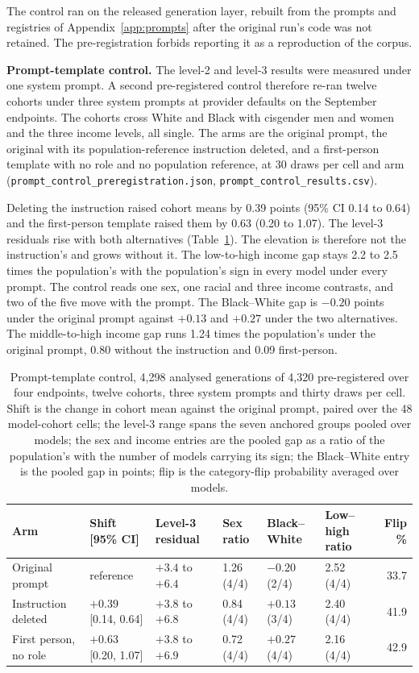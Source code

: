 \documentclass[wcp]{jmlr}
\begin{document}
The control ran on the released generation layer, rebuilt from the prompts and registries of Appendix~\ref{app:prompts} after the original run's code was not retained. The pre-registration forbids reporting it as a reproduction of the corpus.

\textbf{Prompt-template control.} The level-2 and level-3 results were measured under one system prompt. A second pre-registered control therefore re-ran twelve cohorts under three system prompts at provider defaults on the September endpoints. The cohorts cross White and Black with cisgender men and women and the three income levels, all single. The arms are the original prompt, the original with its population-reference instruction deleted, and a first-person template with no role and no population reference, at 30 draws per cell and arm (\texttt{prompt\_control\_preregistration.json}, \texttt{prompt\_control\_results.csv}).

Deleting the instruction raised cohort means by 0.39 points (95\% CI 0.14 to 0.64) and the first-person template raised them by 0.63 (0.20 to 1.07). The level-3 residuals rise with both alternatives (Table~\ref{tab:promptctl}). The elevation is therefore not the instruction's and grows without it. The low-to-high income gap stays 2.2 to 2.5 times the population's with the population's sign in every model under every prompt. The control reads one sex, one racial and three income contrasts, and two of the five move with the prompt. The Black--White gap is $-0.20$ points under the original prompt against $+0.13$ and $+0.27$ under the two alternatives. The middle-to-high income gap runs 1.24 times the population's under the original prompt, 0.80 without the instruction and 0.09 first-person.

\begin{table}[!htb]
\centering
\caption{Prompt-template control, 4,298 analysed generations of 4,320 pre-registered over four endpoints, twelve cohorts, three system prompts and thirty draws per cell. Shift is the change in cohort mean against the original prompt, paired over the 48 model-cohort cells; the level-3 range spans the seven anchored groups pooled over models; the sex and income entries are the pooled gap as a ratio of the population's with the number of models carrying its sign; the Black--White entry is the pooled gap in points; flip is the category-flip probability averaged over models.}
\label{tab:promptctl}
\scriptsize
\setlength{\tabcolsep}{3pt}
\begin{tabular}{llllllr}
\toprule
Arm & Shift [95\% CI] & Level-3 residual & Sex ratio & Black--White & Low--high ratio & Flip \% \\
\midrule
Original prompt & reference & $+3.4$ to $+6.4$ & 1.26 (4/4) & $-0.20$ (2/4) & 2.52 (4/4) & 33.7 \\
Instruction deleted & $+0.39$ [0.14, 0.64] & $+3.8$ to $+6.8$ & 0.84 (4/4) & $+0.13$ (3/4) & 2.40 (4/4) & 41.9 \\
First person, no role & $+0.63$ [0.20, 1.07] & $+3.8$ to $+6.9$ & 0.72 (4/4) & $+0.27$ (4/4) & 2.16 (4/4) & 42.9 \\
\bottomrule
\end{tabular}
\end{table}
\end{document}
